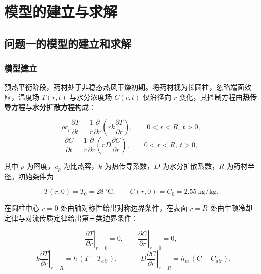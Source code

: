 \newpage
\section{模型的建立与求解}

\subsection{问题一的模型的建立和求解}

\subsubsection{模型建立}

预热平衡阶段，药材处于非稳态热风干燥初期。将药材视为长圆柱，忽略端面效应，温度场 $T(r,t)$ 与水分浓度场 $C(r,t)$ 仅沿径向 $r$ 变化，其控制方程由\textbf{热传导方程}与\textbf{水分扩散方程}构成：

\begin{equation}
	\rho c_p \frac{\partial T}{\partial t} = \frac{1}{r}\frac{\partial}{\partial r}\left(r k \frac{\partial T}{\partial r}\right), \qquad 0<r<R,\ t>0,
	\label{eq:heat}
\end{equation}
\begin{equation}
	\frac{\partial C}{\partial t} = \frac{1}{r}\frac{\partial}{\partial r}\left(r D \frac{\partial C}{\partial r}\right), \qquad 0<r<R,\ t>0,
	\label{eq:mass}
\end{equation}

其中 $\rho$ 为密度，$c_p$ 为比热容，$k$ 为热传导系数，$D$ 为水分扩散系数，$R$ 为药材半径。初始条件为

\begin{equation}
	T(r,0)=T_0=28\ ^\circ\text{C}, \qquad C(r,0)=C_0=2.55\ \text{kg/kg}.
	\label{eq:ic}
\end{equation}

在圆柱中心 $r=0$ 处由轴对称性给出对称边界条件，在表面 $r=R$ 处由牛顿冷却定律与对流传质定律给出第三类边界条件：

\begin{equation}
	\left.\frac{\partial T}{\partial r}\right|_{r=0}=0,\qquad
	\left.\frac{\partial C}{\partial r}\right|_{r=0}=0,
	\label{eq:bc0}
\end{equation}
\begin{equation}
	-k\left.\frac{\partial T}{\partial r}\right|_{r=R}=h\,(T-T_{air}),\qquad
	-D\left.\frac{\partial C}{\partial r}\right|_{r=R}=h_m\,(C-C_{air}),
	\label{eq:bcR}
\end{equation}

